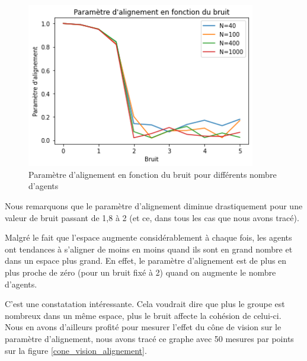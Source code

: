 \documentclass[french, a4paper, 12pt, openany]{report}
\begin{document}
	\begin{figure}[!h]
		\centering
		\includegraphics[width=10cm]{images/comparatif_4.png}
		\caption{Paramètre d'alignement en fonction du bruit pour différents nombre d'agents}
		\label{param_bruit_2}
	\end{figure}
	
	 Nous remarquons que le paramètre d'alignement diminue drastiquement pour une valeur de bruit passant de 1,8 à 2 (et ce, dans tous les cas que nous avons tracé). 
	 
	 Malgré le fait que l'espace augmente considérablement à chaque fois, les agents ont tendances à s'aligner de moins en moins quand ils sont en grand nombre et dans un espace plus grand. En effet, le paramètre d'alignement est de plus en plus proche de zéro (pour un bruit fixé à 2) quand on augmente le nombre d'agents.
	 
	 C'est une constatation intéressante. Cela voudrait dire que plus le groupe est nombreux dans un même espace, plus le bruit affecte la cohésion de celui-ci. \\
	  
	
	Nous en avons d'ailleurs profité pour mesurer l'effet du cône de vision sur le paramètre d'alignement, nous avons tracé ce graphe avec 50 mesures par points sur la figure \ref{cone_vision_alignement}. 
	
\end{document}
